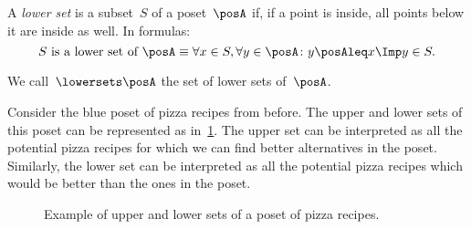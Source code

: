 \begin{definition}
  \label{def:lowerset}
  A \emph{lower set} is a subset~$S$ of a poset~$\posA$ if, if a point is inside, all points below it are inside as well.
  In formulas:
  \begin{equation}
    \text{$S$ is a lower set of $\posA$} \equiv \forall x\in S, \forall y\in \posA \colon y\posAleq x \Imp y\in S.
  \end{equation}
\end{definition}
  We call~$\lowersets \posA$ the set of lower sets of~$\posA$.
%

Consider the blue poset of pizza recipes from before. The upper and lower sets of this poset can be represented as in~\cref{fig:upperset}. The upper set can be interpreted as all the potential pizza recipes for which we can find better alternatives in the poset. Similarly, the lower set can be interpreted as all the potential pizza recipes which would be better than the ones in the poset.

\begin{figure}[h!]
  \begin{center}
  \end{center}
  \caption{Example of upper and lower sets of a poset of pizza recipes.}
  \label{fig:upperset}
\end{figure}

%



